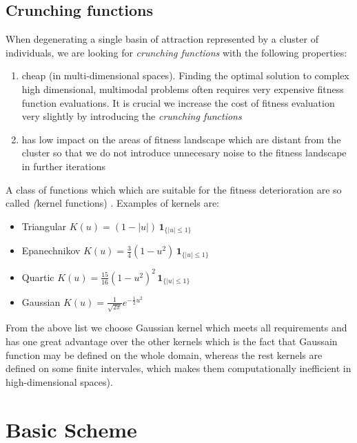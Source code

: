 \subsection{Crunching functions}
When degenerating a single basin of attraction represented by a cluster of
individuals, we are looking for \textit{crunching functions} with the following
properties:

\begin{enumerate}
  \item cheap (in multi-dimensional spaces). Finding the optimal solution to
  complex high dimensional, multimodal problems often requires 
  very expensive fitness function evaluations. It is crucial we increase the
  cost of fitness evaluation very slightly by introducing the \textit{crunching
  functions}
  \item has low impact on the areas of fitness landscape which are distant from
  the cluster so that we do not introduce unnecesary noise to the fitness landscape
  in further iterations
\end{enumerate}

A class of functions which which are suitable for the fitness deterioration are
so called \textit(kernel functions) \cite{kernel}. Examples of kernels are: 
\begin{itemize}
  \item Triangular 	$K(u) = (1-|u|) \,\mathbf{1}_{\{|u|\leq1\}}$
  \item Epanechnikov 	$K(u) = \frac{3}{4}(1-u^2) \,\mathbf{1}_{\{|u|\leq1\}}$
  \item Quartic  $K(u) = \frac{15}{16}(1-u^2)^2 \,\mathbf{1}_{\{|u|\leq1\}}$
  \item Gaussian 	$K(u) = \frac{1}{\sqrt{2\pi}}e^{-\frac{1}{2}u^2}$
\end{itemize}

From the above list we choose Gaussian kernel which meets all requirements and 
has one great advantage over the other kernels which is the fact that
Gaussain function may be defined on the whole domain, whereas the rest
kernels are defined on some finite intervales, which makes them computationally
inefficient in high-dimensional spaces).

\section{Basic Scheme}

